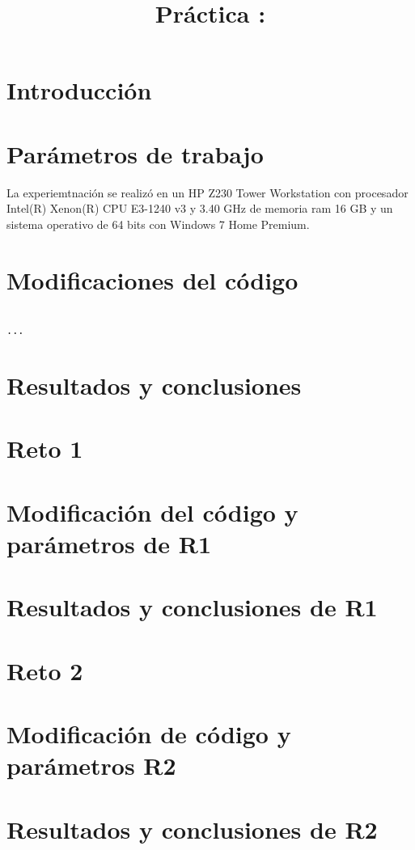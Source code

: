 \documentclass[a4paper]{article}
\title{Práctica : }
\date{}
\begin{document}
\maketitle

\section{Introducci\'on}

\section{Par\'ametros de trabajo}
La experiemtnación se realizó en un HP Z230 Tower Workstation con procesador Intel(R) Xenon(R) CPU E3-1240 v3 y 3.40 GHz de memoria ram 16 GB y un sistema operativo de 64 bits con Windows 7 Home Premium.


\section{Modificaciones del código}


\begin{lstlisting}[frame=single]

...
\end{lstlisting}


\section{Resultados y conclusiones}



\section{Reto 1}


\section{Modificación del código y parámetros de R1}



\section{Resultados y conclusiones de R1}

\section{Reto 2}


\section{Modificación de código y parámetros R2}

\section{Resultados y conclusiones de R2}
\end{document}
